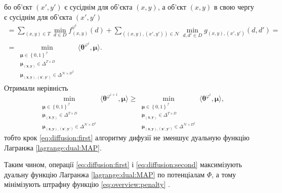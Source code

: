 бо об'єкт $\left(x', y' \right)$ є сусіднім для об'єкта $\left(x, y \right)$,
а об'єкт $\left(x, y \right)$ в свою чергу є сусіднім для об'єкта
$\left(x', y' \right)$
\begin{equation*}
\begin{gathered}
    = \sum \limits_{\left(x, y \right) \in T}
        \min \limits_{d \in D}
            f_{\left(x, y \right)}^{\varphi^i} \left( d \right) +
    \sum \limits_{\left(\left(x, y \right), \left(x', y' \right) \right) \in \mathcal{N}}
        \min \limits_{d, d' \in D}
            g_{\left(x, y \right), \left(x', y' \right)} \left( d, d' \right) = \\
    = \min \limits_{\substack{\pmb{\mu} \in \left\{ 0, 1 \right\}^{\mathcal{I}} \\
                            \pmb{\mu_{\left(x, y \right)}} \in \Delta^{T \times D} \\
                            \pmb{\mu_{\left(x, y \right), \left(x', y' \right)}} \in
                                \Delta^{\mathcal{N} \times D^2}}}
        \langle \pmb{\theta}^{\varphi^i}, \pmb{\mu} \rangle.
\end{gathered}
\end{equation*}
Отримали нерівність
\begin{equation*}
    \min \limits_{\substack{\pmb{\mu} \in \left\{ 0, 1 \right\}^{\mathcal{I}} \\
                            \pmb{\mu_{\left(x, y \right)}} \in \Delta^{T \times D} \\
                            \pmb{\mu_{\left(x, y \right), \left(x', y' \right)}} \in
                                \Delta^{\mathcal{N} \times D^2}}}
        \langle \pmb{\theta}^{\varphi^{i + 1}}, \pmb{\mu} \rangle \ge
    \min \limits_{\substack{\pmb{\mu} \in \left\{ 0, 1 \right\}^{\mathcal{I}} \\
                            \pmb{\mu_{\left(x, y \right)}} \in \Delta^{T \times D} \\
                            \pmb{\mu_{\left(x, y \right), \left(x', y' \right)}} \in
                                \Delta^{\mathcal{N} \times D^2}}}
        \langle \pmb{\theta}^{\varphi^i}, \pmb{\mu} \rangle,
\end{equation*}
тобто крок \eqref{eq:diffusion:first}
алгоритму дифузії не зменшує дуальную функцію Лагранжа \eqref{lagrange:dual:MAP}.


Таким чином,
операції \ref{eq:diffusion:first} і
\ref{eq:diffusion:second} максимізують дуальну функцію Лагранжа
\eqref{lagrange:dual:MAP} по потенціалам
$\Phi$, а тому мінімізують штрафну функцію \ref{eq:overview:penalty}
\cite{overview:savchynskyy:diffusion}.


